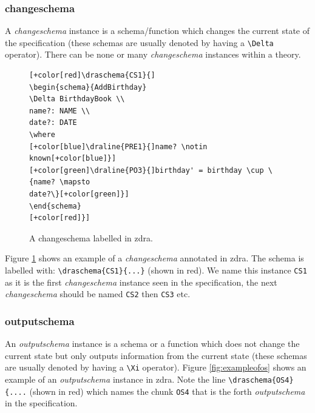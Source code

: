 \subsubsection{changeschema}

A \emph{changeschema} instance is a schema/function which changes the current
state of the specification (these schemas are usually denoted by having a
\verb|\Delta| operator). There can be none or many \emph{changeschema} instances
within a theory.

\begin{center}
\begin{figure}[H]
\centering
\begin{footnotesize}
\begin{BVerbatim}[commandchars=+\[\]] [+color[red]\draschema{CS1}{]
\begin{schema}{AddBirthday}
\Delta BirthdayBook \\
name?: NAME \\
date?: DATE
\where
[+color[blue]\draline{PRE1}{]name? \notin known[+color[blue]}]
[+color[green]\draline{PO3}{]birthday' = birthday \cup \{name? \mapsto
date?\}[+color[green]}]
\end{schema}
[+color[red]}]
\end{BVerbatim}
\end{footnotesize}
\caption{\label{fig:exampleofcs} A changeschema labelled in \gls{zdra}.}
\end{figure}
\end{center}

Figure \ref{fig:exampleofcs} shows an example of a \emph{changeschema} annotated
in \gls{zdra}. The schema is labelled with: \verb|\draschema{CS1}{...}| (shown
in red). We name this instance \verb|CS1| as it is the first \emph{changeschema}
instance seen in the specification, the next \emph{changeschema} should be named
\verb|CS2| then \verb|CS3| etc.

\subsubsection{outputschema}

An \emph{outputschema} instance is a schema or a function which does not change
the current state but only outputs information from the current state (these
schemas are usually denoted by having a \verb|\Xi| operator). Figure
\ref{fig:exampleofos} shows an example of an \emph{outputschema} instance in
\gls{zdra}. Note the line \verb|\draschema{OS4}{....| (shown in red) which names
the chunk \verb|OS4| that is the forth \emph{outputschema} in the specification.

